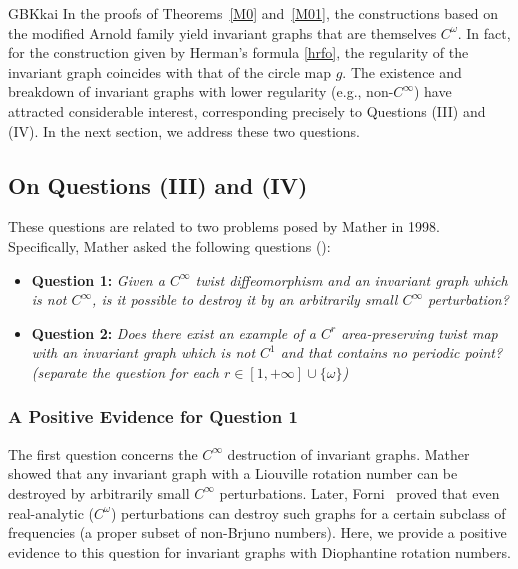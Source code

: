 \documentclass{amsart}
\theoremstyle{definition}
\begin{document}
\begin{CJK*}{GBK}{kai}
In the proofs of Theorems~\ref{M0} and~\ref{M01}, the constructions based on the modified Arnold family yield invariant graphs that are themselves $C^\omega$. In fact, for the construction given by Herman's formula \eqref{hrfo}, the regularity of the invariant graph coincides with that of the circle map $g$. The existence and breakdown of invariant graphs with lower regularity (e.g., non-$C^\infty$) have attracted considerable interest, corresponding precisely to Questions (III) and (IV). In the next section, we address these two questions.


	\vspace{1ex}

		\subsection{{On Questions (III) and (IV)}}
		These questions are related to two problems posed by Mather in 1998. Specifically, Mather asked the following questions (\cite[Page 181-182]{MY}):
		
		
		\vspace{1ex}
		
		\begin{itemize}
			\item \textbf{Question 1:} {\it Given a \( C^\infty \) twist diffeomorphism and an invariant graph which is not \( C^\infty \), is it possible to destroy it by an arbitrarily small \( C^\infty \) perturbation?}
		\end{itemize}
		
		\vspace{1ex}
		
		
		
		
		\begin{itemize}
			\item \textbf{Question 2:} {\it Does there exist an example of a $C^r$  area-preserving twist map with an invariant graph which is not $C^1$ and that contains no periodic point? (separate the
				question for each $r\in [1,+\infty]\cup \{\omega\}$)}
		\end{itemize}
		
		\vspace{1ex}
		
		
		
		\subsubsection{A Positive Evidence for Question 1}
		
		The first question concerns the $C^\infty$ destruction of invariant graphs. Mather~\cite{M4} showed that any invariant graph with a Liouville rotation number can be destroyed by arbitrarily small \( C^\infty \) perturbations. Later, Forni~\cite{F} proved that even real-analytic (\( C^\omega \)) perturbations can destroy such graphs for a certain subclass of frequencies (a proper subset of non-Brjuno numbers). Here, we provide a positive evidence to this question for invariant graphs with Diophantine rotation numbers.
		

\end{CJK*}
\end{document}

